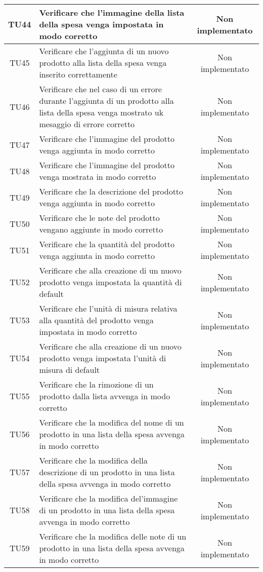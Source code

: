 \begin{center}
\begin{longtable}{|c|>{\centering}m{10cm}|c|}
		TU44 & Verificare che l'immagine della lista della spesa venga impostata in modo corretto & Non implementato \\ \hline
		TU45 & Verificare che l'aggiunta di un nuovo prodotto alla lista della spesa venga inserito correttamente & Non implementato \\ \hline
		TU46 & Verificare che nel caso di un errore durante l'aggiunta di un prodotto alla lista della spesa venga mostrato uk mesaggio di errore corretto & Non implementato \\ \hline
		TU47 & Verificare che l'immagine del prodotto venga aggiunta in modo corretto & Non implementato \\ \hline
		TU48 & Verificare che l'immagine del prodotto venga mostrata in modo corretto & Non implementato \\ \hline
		TU49 & Verificare che la descrizione del prodotto venga aggiunta in modo corretto & Non implementato \\ \hline
		TU50 & Verificare che le note del prodotto vengano aggiunte in modo corretto & Non implementato \\ \hline
		TU51 & Verificare che la quantità del prodotto venga aggiunta in modo corretto & Non implementato \\ \hline
		TU52 & Verificare che alla creazione di un nuovo prodotto venga impostata la quantità di default & Non implementato \\ \hline
		TU53 & Verificare che l'unità di misura relativa alla quantità del prodotto venga impostata in modo corretto & Non implementato \\ \hline
		TU54 & Verificare che alla creazione di un nuovo prodotto venga impostata l'unità di misura di default & Non implementato \\ \hline
		TU55 & Verificare che la rimozione di un prodotto dalla lista avvenga in modo corretto & Non implementato \\ \hline
		TU56 & Verificare che la modifica del nome di un prodotto in una lista della spesa avvenga in modo corretto & Non implementato \\ \hline
		TU57 & Verificare che la modifica della descrizione di un prodotto in una lista della spesa avvenga in modo corretto & Non implementato \\ \hline
		TU58 & Verificare che la modifica del'immagine di un prodotto in una lista della spesa avvenga in modo corretto & Non implementato \\ \hline
		TU59 & Verificare che la modifica delle note di un prodotto in una lista della spesa avvenga in modo corretto & Non implementato \\ \hline

\end{longtable}
\end{center}
